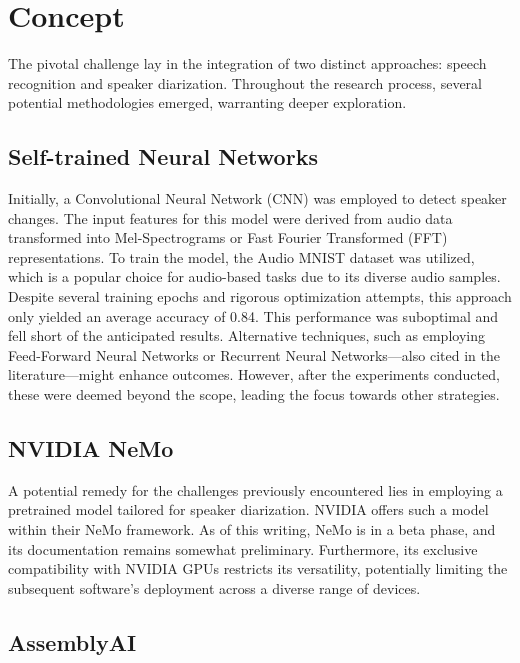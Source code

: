 \documentclass[12pt]{article}
\begin{document}
\section{Concept}
\label{sec:concept}

The pivotal challenge lay in the integration of two distinct approaches: speech recognition and speaker diarization. Throughout the research process, several potential methodologies emerged, warranting deeper exploration.

\subsection{Self-trained Neural Networks}
\label{ssec:cnn}

Initially, a Convolutional Neural Network (CNN) was employed to detect speaker changes. The input features for this model were derived from audio data transformed into Mel-Spectrograms or Fast Fourier Transformed (FFT) representations. To train the model, the Audio MNIST dataset \cite{AudioMNIST} was utilized, which is a popular choice for audio-based tasks due to its diverse audio samples. Despite several training epochs and rigorous optimization attempts, this approach only yielded an average accuracy of 0.84. This performance was suboptimal and fell short of the anticipated results. Alternative techniques, such as employing Feed-Forward Neural Networks or Recurrent Neural Networks—also cited in the literature—might enhance outcomes. However, after the experiments conducted, these were deemed beyond the scope, leading the focus towards other strategies. \cite{Jia2021}

\subsection{NVIDIA NeMo}
\label{ssec:nemo}

A potential remedy for the challenges previously encountered lies in employing a pretrained model tailored for speaker diarization. NVIDIA offers such a model within their NeMo framework. As of this writing, NeMo is in a beta phase, and its documentation remains somewhat preliminary. Furthermore, its exclusive compatibility with NVIDIA GPUs restricts its versatility, potentially limiting the subsequent software's deployment across a diverse range of devices.

\subsection{AssemblyAI}
\label{ssec:aai}
\end{document}
